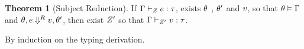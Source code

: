 \documentclass[a4paper,11pt]{article}
\theoremstyle{definition}
\newtheorem{thm}{Theorem}
\begin{document}
\begin{thm}[Subject Reduction]
\label{sub-red}
If $\Gamma \vdash_{Z} e : \tau$, exists $\theta$ , $\theta'$ and $v$,
so that $\theta \vDash \Gamma$ and $\theta , e \mathrel{\Downarrow^{R}} v,
\theta'  $, then  exist $Z'$ so that $ \Gamma  \vdash_{Z'} v : \tau $.  
\end{thm}
By induction on the typing derivation.
\end{document}
